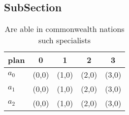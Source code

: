 \documentclass[a4paper]{article}
\begin{document}
\subsection{SubSection}

\begin{table}
\begin{adjustbox}{width=0.5\columnwidth}
\begin{tabular}{|l|l|l|l|l|}
\hline
\textbf{plan} & \multicolumn{1}{c|}{\textbf{0}} & \multicolumn{1}{c|}{\textbf{1}} & \multicolumn{1}{c|}{\textbf{2}} & \multicolumn{1}{c|}{\textbf{3}} \\ \hline
\textbf{$a_0$}  & (0,0) & (1,0) & (2,0) & (3,0) \\ \hline
\textbf{$a_1$}  & (0,0) & (1,0) & (2,0) & (3,0) \\ \hline
\textbf{$a_2$}  & (0,0) & (1,0) & (2,0) & (3,0) \\ \hline
\end{tabular}
\end{adjustbox}
\caption{Are able in commonwealth nations such specialists
}
\end{table}
\end{document}
